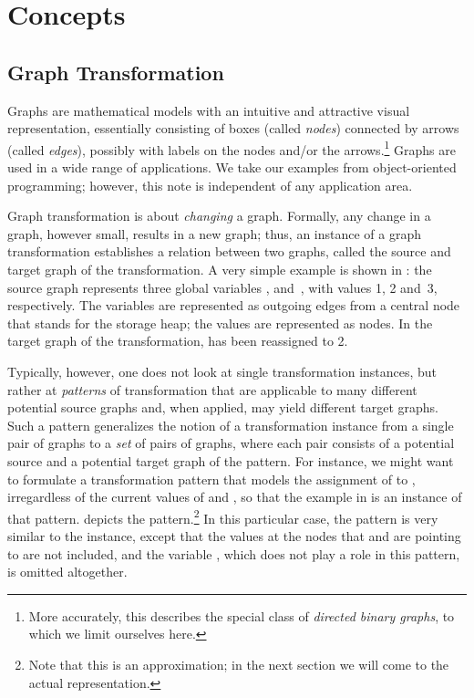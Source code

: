 \section{Concepts}
\suppressfloats[t]

\subsection{Graph Transformation}

Graphs are mathematical models with an intuitive and attractive visual
representation, essentially consisting of boxes (called \emph{nodes}) connected
by arrows (called \emph{edges}), possibly with labels on the nodes and/or the
arrows.\footnote{More accurately, this describes the special class of
\emph{directed binary graphs}, to which we limit ourselves here.} Graphs are
used in a wide range of applications. We take our examples from object-oriented
programming; however, this note is independent of any application area.

Graph transformation is about \emph{changing} a graph. Formally, any change in
a graph, however small, results in a new graph; thus, an instance of a graph
transformation establishes a relation between two graphs, called the source and
target graph of the transformation. A very simple example is shown in
: the source graph represents three global variables \xx,
\yy{} and~\zz, with values 1, 2 and~3, respectively. The variables are
represented as outgoing edges from a central node that stands for the storage
heap; the values are represented as nodes. In the target graph of the
transformation, \xx{} has been reassigned to 2.
%

Typically, however, one does not look at single transformation instances, but
rather at \emph{patterns} of transformation that are applicable to many
different potential source graphs and, when applied, may yield different target
graphs. Such a pattern generalizes the notion of a transformation instance from
a single pair of graphs to a \emph{set} of pairs of graphs, where each pair
consists of a potential source and a potential target graph of the pattern. For
instance, we might want to formulate a transformation pattern that models the
assignment of \yy{} to \xx, irregardless of the current values of
\xx{} and \yy, so that the example in  is an
instance of that pattern.  depicts the
pattern.\footnote{Note that this is an approximation; in the next section
  we will come to the actual representation.} In this particular case, the
pattern is very similar to the instance, except that the values at the nodes
that \xx{} and \yy{} are pointing to are not included, and the variable
\zz, which does not play a role in this pattern, is omitted altogether.
%

